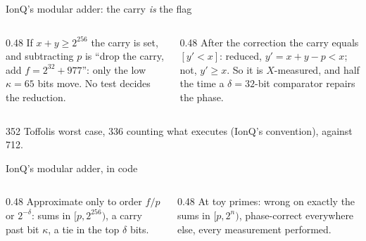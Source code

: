 \documentclass[aspectratio=169,11pt]{beamer}
\newcommand{\code}[2][]{}
\begin{document}
\setcounter{framenumber}{174}
\begin{frame}{IonQ's modular adder: the carry \emph{is} the flag}
  \centering
  \vskip3mm
  \raggedright
  \begin{columns}[T]
    \begin{column}{0.48\textwidth}
      \small If $x+y\ge2^{256}$ the carry is set, and subtracting $p$ is ``drop the carry, add $f=2^{32}+977$'': only the low $\kappa=65$ bits move. No test decides the reduction.
    \end{column}
    \begin{column}{0.48\textwidth}
      \small After the correction the carry equals $[y'<x]$: reduced, $y'=x+y-p<x$; not, $y'\ge x$. So it is $X$-measured, and half the time a $\delta=32$-bit comparator repairs the phase.
    \end{column}
  \end{columns}
  \begin{takeaway}352 Toffolis worst case, 336 counting what executes (IonQ's convention), against 712.\end{takeaway}
\end{frame}

\setcounter{framenumber}{175}
\begin{frame}[fragile]{IonQ's modular adder, in code}
  \code[basicstyle=\ttfamily\fontsize{7.6}{8.8}\selectfont]{modadd_pm_phase.py}
  \begin{columns}[T]
    \begin{column}{0.48\textwidth}
      {\small Approximate only to order $f/p$ or $2^{-\delta}$: sums in $[p,2^{256})$, a carry past bit $\kappa$, a tie in the top $\delta$ bits.}
    \end{column}
    \begin{column}{0.48\textwidth}
      {\small At toy primes: wrong on exactly the sums in $[p,2^n)$, phase-correct everywhere else, every measurement performed.}
    \end{column}
  \end{columns}
\end{frame}
\end{document}

